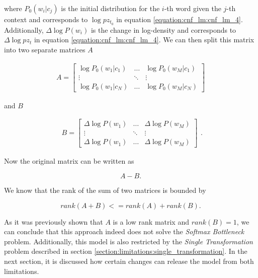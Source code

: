 where $ P_0(w_i | c_j) $ is the initial distribution for the $ i $-th word given the $ j $-th context and corresponds to $ \log pz_{t_0} $ in equation \ref{equation:cnf_lm:cnf_lm_4}. Additionally, $ \Delta \log P(w_i) $ is the change in log-density and corresponds to $ \Delta \log pz_t $ in equation \ref{equation:cnf_lm:cnf_lm_4}. We can then split this matrix into two separate matrices $ A $ 

\begin{displaymath}
    \begin{matrix}
    A = \begin{bmatrix}
       \log P_0(w_1 | c_1) & \hdots & \log P_0(w_M | c_1) \\
       \vdots & \ddots & \vdots \\
       \log P_0(w_1 | c_N) & \hdots & \log P_0(w_M | c_N)
      \end{bmatrix}
    \end{matrix}
\end{displaymath}

and $ B $

\begin{displaymath}
    \begin{matrix}
    B = \begin{bmatrix}
       \Delta \log P(w_1) & \hdots & \Delta \log P(w_M) \\
       \vdots & \ddots & \vdots \\
       \Delta \log P(w_1) & \hdots & \Delta \log P(w_M)
      \end{bmatrix}
    \end{matrix}.
\end{displaymath}

Now the original matrix can be written as

\begin{displaymath}
    A - B.
\end{displaymath}

We know that the rank of the sum of two matrices is bounded by


\begin{displaymath}
    rank(A + B) <= rank(A) + rank(B).
\end{displaymath}

As it was previously shown that $ A $ is a low rank matrix and $ rank(B) = 1 $, we can conclude that this approach indeed does not solve the \emph{Softmax Bottleneck} problem. Additionally, this model is also restricted by the \emph{Single Transformation} problem described in section \ref{section:limitations:single_transformation}. In the next section, it is discussed how certain changes can release the model from both limitations.

